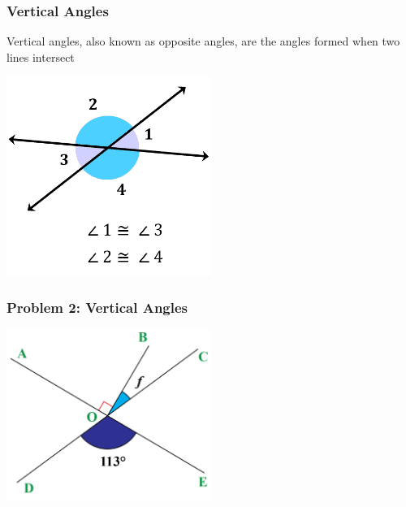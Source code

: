 \documentclass{beamer}
\begin{document}
\begin{frame}
    \frametitle{Vertical Angles}
    \begin{block}{}
        Vertical angles, also known as opposite angles, are the angles formed when two lines intersect
    \end{block}
    \begin{center}
        \includegraphics[width=0.5\textwidth]{vertical_angles_1.png} %
    \end{center}

\end{frame}


\begin{frame}
    \frametitle{Problem 2: Vertical Angles}
\begin{center}
    \includegraphics[width=0.5\textwidth]{vertical_angles_2.png} %
\end{center}
\end{frame}
\end{document}
